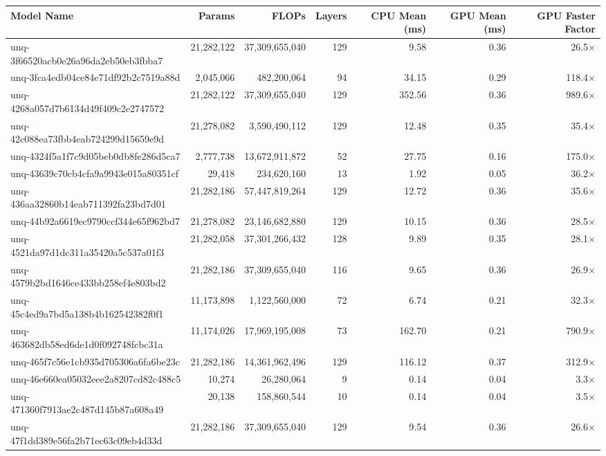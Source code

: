 \begin{table}[h!]
\centering
\fontsize{7}{9}\selectfont
\begin{tabular}{lrrrrrr}
\toprule
\textbf{Model Name} & \textbf{Params} & \textbf{FLOPs} & \textbf{Layers} & \textbf{CPU Mean (ms)} & \textbf{GPU Mean (ms)} & \textbf{GPU Faster Factor} \\
\midrule
unq-3f66520acb0e26a96da2eb50eb3fbba7 & 21,282,122 & 37,309,655,040 & 129 & 9.58 & 0.36 & 26.5$\times$ \\
unq-3fca4edb04ce84e71df92b2c7519a88d & 2,045,066 & 482,200,064 & 94 & 34.15 & 0.29 & 118.4$\times$ \\
unq-4268a057d7b6134d49f409c2e2747572 & 21,282,122 & 37,309,655,040 & 129 & 352.56 & 0.36 & 989.6$\times$ \\
unq-42c088ea73fbb4eab724299d15659e9d & 21,278,082 & 3,590,490,112 & 129 & 12.48 & 0.35 & 35.4$\times$ \\
unq-4324f5a1f7c9d05beb0db8fe286d5ca7 & 2,777,738 & 13,672,911,872 & 52 & 27.75 & 0.16 & 175.0$\times$ \\
unq-43639c70cb4cfa9a9943e015a80351cf & 29,418 & 234,620,160 & 13 & 1.92 & 0.05 & 36.2$\times$ \\
unq-436aa32860b14eab711392fa23bd7d01 & 21,282,186 & 57,447,819,264 & 129 & 12.72 & 0.36 & 35.6$\times$ \\
unq-44b92a6619ec9790ccf344e65f962bd7 & 21,278,082 & 23,146,682,880 & 129 & 10.15 & 0.36 & 28.5$\times$ \\
unq-4521da97d1dc311a35420a5c537a01f3 & 21,282,058 & 37,301,266,432 & 128 & 9.89 & 0.35 & 28.1$\times$ \\
unq-4579b2bd1646ce433bb258ef4e803bd2 & 21,282,186 & 37,309,655,040 & 116 & 9.65 & 0.36 & 26.9$\times$ \\
unq-45c4ed9a7bd5a138b4b162542382f0f1 & 11,173,898 & 1,122,560,000 & 72 & 6.74 & 0.21 & 32.3$\times$ \\
unq-463682db58ed6de1d0f092748fcbc31a & 11,174,026 & 17,969,195,008 & 73 & 162.70 & 0.21 & 790.9$\times$ \\
unq-465f7c56e1cb935d705306a6fa6be23c & 21,282,186 & 14,361,962,496 & 129 & 116.12 & 0.37 & 312.9$\times$ \\
unq-46e660ea05032eee2a8207cd82c488c5 & 10,274 & 26,280,064 & 9 & 0.14 & 0.04 & 3.3$\times$ \\
unq-471360f7913ae2c487d145b87a608a49 & 20,138 & 158,860,544 & 10 & 0.14 & 0.04 & 3.5$\times$ \\
unq-47f1dd389e56fa2b71ec63c09eb4d33d & 21,282,186 & 37,309,655,040 & 129 & 9.54 & 0.36 & 26.6$\times$ \\

\end{tabular}
\end{table}
